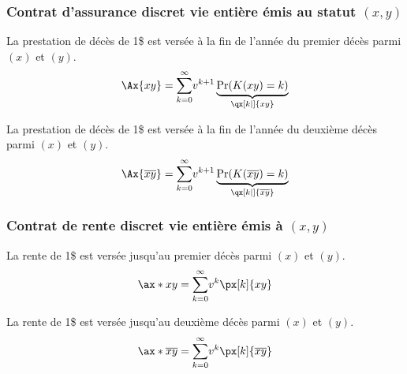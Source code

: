 \documentclass[10pt, french]{article}
\begin{document}
\begin{multicols*}{2}

\subsubsection*{Contrat d'assurance discret vie entière émis au statut $(x, y)$}
La prestation de décès de 1\$ est versée à la fin de l'année du premier décès parmi $(x)$ et $(y)$.
\begin{align*}
	\Ax{xy}
	&=	\sumz{\infty}{k = 0} v^{k + 1} \underbrace{\Pr(K(xy) = k)}_{\qx[k|]{xy}}	\\
\end{align*}

La prestation de décès de 1\$ est versée à la fin de l'année du deuxième décès parmi $(x)$ et $(y)$.
\begin{align*}
	\Ax{\overline{xy}}
	&=	\sumz{\infty}{k = 0} v^{k + 1} \underbrace{\Pr(K(\overline{xy}) = k)}_{\qx[k|]{\overline{xy}}}	\\
\end{align*}


\subsubsection*{Contrat de rente discret vie entière émis à $(x, y)$}
La rente de 1\$ est versée jusqu'au premier décès parmi $(x)$ et $(y)$.
\begin{align*}
	\ax*{xy}
	&=	\sumz{\infty}{k = 0}	v^{k} \px[k]{xy}	\\
\end{align*}

La rente de 1\$ est versée jusqu'au deuxième décès parmi $(x)$ et $(y)$.
\begin{align*}
	\ax*{\overline{xy}}
	&=	\sumz{\infty}{k = 0}	v^{k} \px[k]{\overline{xy}}	\\
\end{align*}


\end{multicols*}
\end{document}
